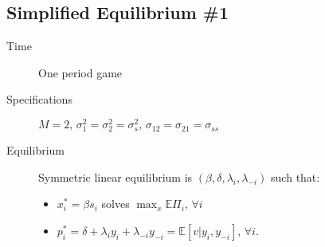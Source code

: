 \documentclass{scrartcl}
\def\exp{\mathbb{E}}
\begin{document}
			\subsection*{Simplified Equilibrium \#1}
			\begin{description}
				\item[Time] One period game
				\item[Specifications] $M = 2, \, \sigma_1^2 = \sigma_2^2 = \sigma_s^2, \, \sigma_{12} = \sigma_{21} = \sigma_{ss} $
				\item[Equilibrium] Symmetric linear equilibrium is $(\beta,\delta,\lambda_i,\lambda_{-i})$ such that:
				\begin{itemize}
					\item $x_i^* = \beta s_i$ solves $\max_x \exp\Pi_i, \, \forall i $
					\item $p_i^* = \delta + \lambda_i y_i + \lambda_{-i} y_{-i} = \exp[v|y_i,y_{-i}], \, \forall i $.
				\end{itemize}
			\end{description}
\end{document}
